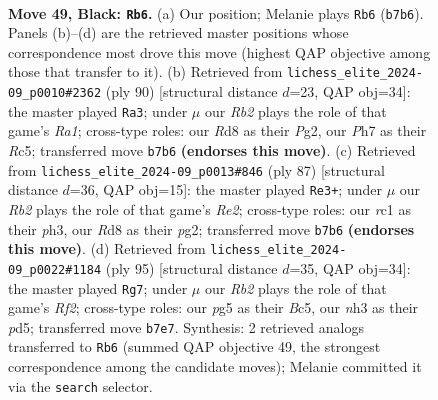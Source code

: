 \documentclass[11pt]{article}
\begin{document}
\clearpage

\begin{figure}[p]\centering
\begin{subfigure}{0.46\textwidth}\centering
\resizebox{\linewidth}{!}{%
\newchessgame
\chessboard[
  setfen={3r1k2/1r3p1p/8/p5P1/3p4/1P5N/1R1K3P/2R5 b - - 0 49},
  showmover=false,
  pgfstyle=straightmove, color=movearrow, markmove={b7-b6}
]}
\caption{}
\end{subfigure}\hfill
\begin{subfigure}{0.46\textwidth}\centering
\resizebox{\linewidth}{!}{%
\newchessgame
\chessboard[
  setfen={8/r5kp/1r1n2p1/2RP2P1/p7/8/6P1/R5K1 w - - 3 46},
  showmover=false,
  pgfstyle=straightmove, color=movearrow, markmove={a1-a3}
]}
\caption{}
\end{subfigure}
\\[4pt]
\begin{subfigure}{0.46\textwidth}\centering
\resizebox{\linewidth}{!}{%
\newchessgame
\chessboard[
  setfen={2r2k2/2P1r1p1/5p2/7p/2R5/6KP/6P1/2R5 b - - 5 44},
  showmover=false,
  pgfstyle=straightmove, color=movearrow, markmove={e7-e3}
]}
\caption{}
\end{subfigure}\hfill
\begin{subfigure}{0.46\textwidth}\centering
\resizebox{\linewidth}{!}{%
\newchessgame
\chessboard[
  setfen={8/5r1k/3p3p/2bP4/5PP1/2r5/4R1KP/5R2 b - - 0 48},
  showmover=false,
  pgfstyle=straightmove, color=movearrow, markmove={f7-g7}
]}
\caption{}
\end{subfigure}
\caption{\textbf{Move 49, Black: \texttt{Rb6}.} (a) Our position; Melanie plays \texttt{Rb6} (\texttt{b7b6}). Panels (b)--(d) are the retrieved master positions whose correspondence most drove this move (highest QAP objective among those that transfer to it). (b) Retrieved from \texttt{lichess\_elite\_2024-09\_p0010\#2362} (ply 90) [structural distance $d$=23, QAP obj=34]: the master played \texttt{Ra3}; under $\mu$ our \emph{Rb2} plays the role of that game's \emph{Ra1}; cross-type roles: our \emph{R}d8 as their \emph{P}g2, our \emph{P}h7 as their \emph{R}c5; transferred move \texttt{b7b6} \textbf{(endorses this move)}. (c) Retrieved from \texttt{lichess\_elite\_2024-09\_p0013\#846} (ply 87) [structural distance $d$=36, QAP obj=15]: the master played \texttt{Re3+}; under $\mu$ our \emph{Rb2} plays the role of that game's \emph{Re2}; cross-type roles: our \emph{r}c1 as their \emph{p}h3, our \emph{R}d8 as their \emph{p}g2; transferred move \texttt{b7b6} \textbf{(endorses this move)}. (d) Retrieved from \texttt{lichess\_elite\_2024-09\_p0022\#1184} (ply 95) [structural distance $d$=35, QAP obj=34]: the master played \texttt{Rg7}; under $\mu$ our \emph{Rb2} plays the role of that game's \emph{Rf2}; cross-type roles: our \emph{p}g5 as their \emph{B}c5, our \emph{n}h3 as their \emph{p}d5; transferred move \texttt{b7e7}. Synthesis: 2 retrieved analogs transferred to \texttt{Rb6} (summed QAP objective 49, the strongest correspondence among the candidate moves); Melanie committed it via the \texttt{search} selector.}
\label{fig:thought-m97}
\end{figure}
\end{document}
